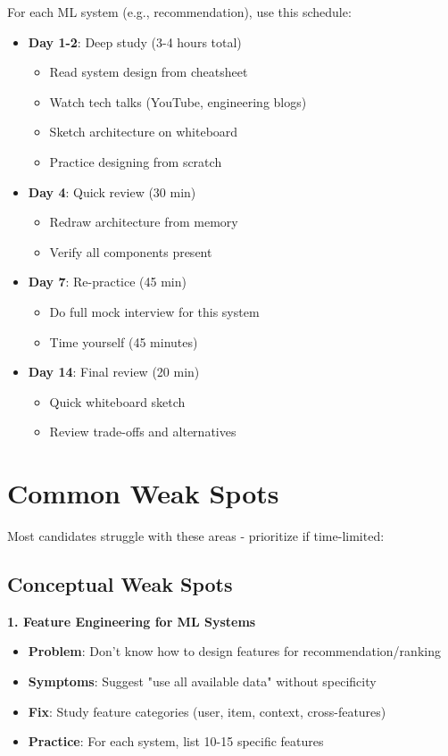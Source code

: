 \documentclass[10pt]{article}
\begin{document}
For each ML system (e.g., recommendation), use this schedule:

\begin{itemize}
\item \textbf{Day 1-2}: Deep study (3-4 hours total)
\begin{itemize}
\item Read system design from cheatsheet
\item Watch tech talks (YouTube, engineering blogs)
\item Sketch architecture on whiteboard
\item Practice designing from scratch
\end{itemize}

\item \textbf{Day 4}: Quick review (30 min)
\begin{itemize}
\item Redraw architecture from memory
\item Verify all components present
\end{itemize}

\item \textbf{Day 7}: Re-practice (45 min)
\begin{itemize}
\item Do full mock interview for this system
\item Time yourself (45 minutes)
\end{itemize}

\item \textbf{Day 14}: Final review (20 min)
\begin{itemize}
\item Quick whiteboard sketch
\item Review trade-offs and alternatives
\end{itemize}
\end{itemize}

\section{Common Weak Spots}

Most candidates struggle with these areas - prioritize if time-limited:

\subsection{Conceptual Weak Spots}

\textbf{1. Feature Engineering for ML Systems}
\begin{itemize}
\item \textbf{Problem}: Don't know how to design features for recommendation/ranking
\item \textbf{Symptoms}: Suggest "use all available data" without specificity
\item \textbf{Fix}: Study feature categories (user, item, context, cross-features)
\item \textbf{Practice}: For each system, list 10-15 specific features
\end{itemize}
\end{document}
